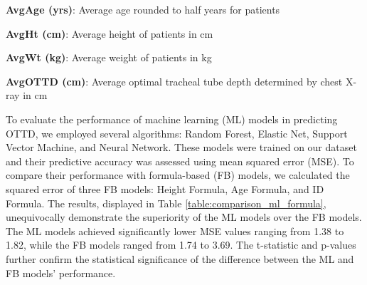 \documentclass[11pt]{article}
\begin{document}
\begin{table}[h]
\caption{Statistical analysis of patient data by sex}
\label{table:summary_stats_sex}
\begin{threeparttable}
\renewcommand{\TPTminimum}{\linewidth}
\begin{tablenotes}
\footnotesize
\item \textbf{AvgAge (yrs)}: Average age rounded to half years for patients
\item \textbf{AvgHt (cm)}: Average height of patients in cm
\item \textbf{AvgWt (kg)}: Average weight of patients in kg
\item \textbf{AvgOTTD (cm)}: Average optimal tracheal tube depth determined by chest X-ray in cm
\end{tablenotes}
\end{threeparttable}
\end{table}


To evaluate the performance of machine learning (ML) models in predicting OTTD, we employed several algorithms: Random Forest, Elastic Net, Support Vector Machine, and Neural Network. These models were trained on our dataset and their predictive accuracy was assessed using mean squared error (MSE). To compare their performance with formula-based (FB) models, we calculated the squared error of three FB models: Height Formula, Age Formula, and ID Formula. The results, displayed in Table \ref{table:comparison_ml_formula}, unequivocally demonstrate the superiority of the ML models over the FB models. The ML models achieved significantly lower MSE values ranging from 1.38 to 1.82, while the FB models ranged from 1.74 to 3.69. The t-statistic and p-values further confirm the statistical significance of the difference between the ML and FB models' performance.
\end{document}
